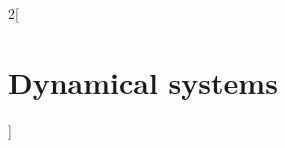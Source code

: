 \documentclass[../../../main.tex]{subfiles}
\begin{document}
\renewcommand{\col}{\apl}
\begin{multicols}{2}[\section{Dynamical systems}]

\end{multicols}
\end{document}
